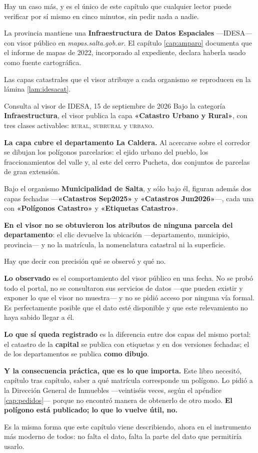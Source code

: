 Hay un caso más, y es el único de este capítulo que cualquier lector puede verificar por sí
mismo en cinco minutos, sin pedir nada a nadie.

La provincia mantiene una \textbf{Infraestructura de Datos Espaciales} ---IDESA--- con visor
público en \textit{mapas.salta.gob.ar}. El capítulo \ref{cap:amparo} documenta que el informe de mapas de 2022, incorporado al expediente, declara haberla usado como fuente cartográfica.

Las capas catastrales que el visor atribuye a cada organismo se reproducen en la lámina \ref{lam:idesacat}.

\begin{ficha}{Consulta al visor de IDESA, 15 de septiembre de 2026}
Bajo la categoría \textbf{Infraestructura}, el visor publica la capa \textbf{«Catastro Urbano y
Rural»}, con tres clases activables: \textsc{rural}, \textsc{subrural} y \textsc{urbano}.

\textbf{La capa cubre el departamento La Caldera.} Al acercarse sobre el corredor se dibujan los
polígonos parcelarios: el ejido urbano del pueblo, los fraccionamientos del valle y, al este del
cerro Pucheta, dos conjuntos de parcelas de gran extensión.

Bajo el organismo \textbf{Municipalidad de Salta}, y sólo bajo él, figuran además dos capas
fechadas ---\textbf{«Catastros Sep2025»} y \textbf{«Catastros Jun2026»}---, cada una con
\textbf{«Polígonos Catastro»} y \textbf{«Etiquetas Catastro»}.

\textbf{En el visor no se obtuvieron los atributos de ninguna parcela del departamento}: el
clic devuelve la ubicación ---departamento, municipio, provincia--- y no la matrícula, la
nomenclatura catastral ni la superficie.
\end{ficha}

\begin{cautela}
Hay que decir con precisión qué se observó y qué no.

\textbf{Lo observado} es el comportamiento del visor público en una fecha. No se probó todo el
portal, no se consultaron sus servicios de datos ---que pueden existir y exponer lo que el
visor no muestra--- y no se pidió acceso por ninguna vía formal. Es perfectamente posible que
el dato esté disponible y que este relevamiento no haya sabido llegar a él.

\textbf{Lo que sí queda registrado} es la diferencia entre dos capas del mismo portal: el
catastro de la \textbf{capital} se publica con etiquetas y en dos versiones fechadas; el de los
departamentos se publica \textbf{como dibujo}.

\textbf{Y la consecuencia práctica, que es lo que importa.} Este libro necesitó, capítulo tras
capítulo, saber a qué matrícula corresponde un polígono. Lo pidió a la Dirección General de
Inmuebles ---veintiséis veces, según el apéndice \ref{cap:pedidos}--- porque no encontró
manera de obtenerlo de otro modo. \textbf{El polígono está publicado; lo que lo vuelve útil,
no.}

Es la misma forma que este capítulo viene describiendo, ahora en el instrumento más moderno de
todos: no falta el dato, falta la parte del dato que permitiría usarlo.
\end{cautela}

